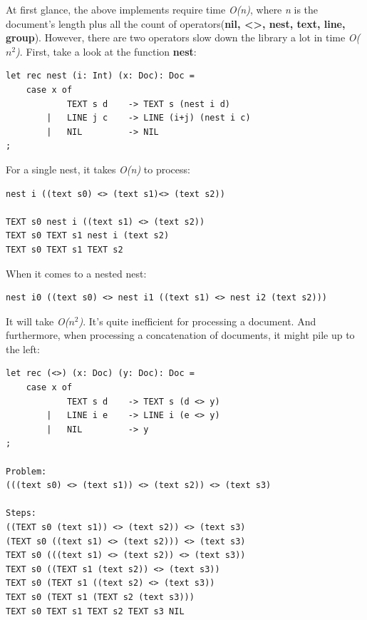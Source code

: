 At first glance, the above implements require time \textit{O(n)}, where \textit{n} is the document's length plus all the count of operators(\textbf{nil, <>, nest, text, line, group}). However, there are two operators slow down the library a lot in time \textit{O($n^2$)}. First, take a look at the function \textbf{nest}:
\begin{lstlisting}
let rec nest (i: Int) (x: Doc): Doc =
    case x of
            TEXT s d    -> TEXT s (nest i d)
        |   LINE j c    -> LINE (i+j) (nest i c)
        |   NIL         -> NIL
;
\end{lstlisting}
For a single nest, it takes \textit{O(n)} to process:
\begin{lstlisting}
nest i ((text s0) <> (text s1)<> (text s2))

TEXT s0 nest i ((text s1) <> (text s2))
TEXT s0 TEXT s1 nest i (text s2)	
TEXT s0 TEXT s1 TEXT s2
\end{lstlisting}
When it comes to a nested nest:
\begin{lstlisting}
nest i0 ((text s0) <> nest i1 ((text s1) <> nest i2 (text s2)))
\end{lstlisting}
It will take \textit{O($n^2$)}. It's quite inefficient for processing a document. And furthermore, when processing a concatenation of documents, it might pile up to the left:
\begin{lstlisting}
let rec (<>) (x: Doc) (y: Doc): Doc =
    case x of
            TEXT s d    -> TEXT s (d <> y)
        |   LINE i e    -> LINE i (e <> y)
        |   NIL         -> y
;

Problem:
(((text s0) <> (text s1)) <> (text s2)) <> (text s3)

Steps:
((TEXT s0 (text s1)) <> (text s2)) <> (text s3)
(TEXT s0 ((text s1) <> (text s2))) <> (text s3)
TEXT s0 (((text s1) <> (text s2)) <> (text s3))
TEXT s0 ((TEXT s1 (text s2)) <> (text s3))
TEXT s0 (TEXT s1 ((text s2) <> (text s3))
TEXT s0 (TEXT s1 (TEXT s2 (text s3)))
TEXT s0 TEXT s1 TEXT s2 TEXT s3 NIL
\end{lstlisting}

